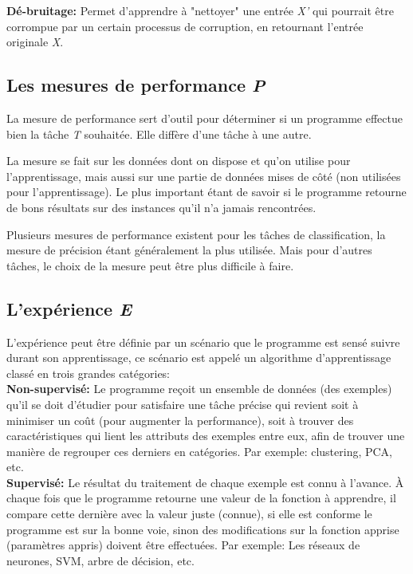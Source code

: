 \textbf{Dé-bruitage:} Permet d'apprendre à "nettoyer" une entrée \textit{X'} qui pourrait être corrompue par un certain processus de corruption, en retournant l'entrée originale \textit{X}.\\

\subsection{Les mesures de performance \textit{P}}

	La mesure de performance sert d'outil pour déterminer si un programme effectue bien la tâche \textit{T} souhaitée. Elle diffère d'une tâche à une autre.
	
	La mesure se fait sur les données dont on dispose et qu'on utilise pour l'apprentissage, mais aussi sur une partie de données mises de côté (non utilisées pour l'apprentissage). Le plus important étant de savoir si le programme retourne de bons résultats sur des instances qu'il n'a jamais rencontrées.   

	Plusieurs mesures de performance existent pour les tâches de classification, la mesure de précision étant généralement la plus utilisée. Mais pour d'autres tâches, le choix de la mesure peut être plus difficile à faire.

\subsection{L’expérience \textit{E}}

	L'expérience peut être définie par un scénario que le programme est sensé suivre durant son apprentissage, ce scénario est appelé un algorithme d'apprentissage classé en trois grandes catégories:\\
	
\textbf{Non-supervisé:} Le programme reçoit un ensemble de données (des exemples) qu'il se doit d'étudier pour satisfaire une tâche précise qui revient soit à minimiser un coût (pour augmenter la performance), soit à trouver des caractéristiques qui lient les attributs des exemples entre eux, afin de trouver une manière de regrouper ces derniers en catégories. Par exemple: clustering, PCA, etc.\\

\textbf{Supervisé:} Le résultat du traitement de chaque exemple est connu à l'avance. À chaque fois que le programme retourne une valeur de la fonction à apprendre, il compare cette dernière avec la valeur juste (connue), si elle est conforme le programme est sur la bonne voie, sinon des modifications sur la fonction apprise (paramètres appris) doivent être effectuées. Par exemple: Les réseaux de neurones, SVM, arbre de décision, etc.\\

